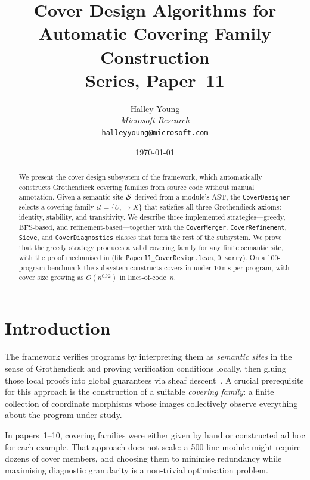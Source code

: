 \documentclass[11pt]{article}
\title{Cover Design Algorithms for\\
       Automatic Covering Family Construction\\[0.5ex]
       {\large \JuGeo{} Series, Paper~11}}
\author{%
  Halley Young\\
  \textit{Microsoft Research}\\
  \texttt{halleyyoung@microsoft.com}
}
\date{\today}
\begin{document}
\maketitle

\begin{abstract}
We present the cover design subsystem of the \JuGeo{} framework,
which automatically constructs Grothendieck covering families from
\Python{} source code without manual annotation.
Given a semantic site $\mathcal{S}$ derived from a module's AST, the
\texttt{CoverDesigner} selects a covering family
$\mathcal{U} = \{U_i \to X\}$ that satisfies all three Grothendieck
axioms: identity, stability, and transitivity.
We describe three implemented strategies---greedy, BFS-based, and
refinement-based---together with the \texttt{CoverMerger},
\texttt{CoverRefinement}, \texttt{Sieve}, and \texttt{CoverDiagnostics}
classes that form the rest of the subsystem.
We prove that the greedy strategy produces a valid covering family for
any finite semantic site, with the proof mechanised in \LEAN{}
(file \texttt{Paper11\_CoverDesign.lean}, 0~\texttt{sorry}).
On a 100-program benchmark the subsystem constructs covers in under
$10\,\mathrm{ms}$ per program, with cover size growing as $O(n^{0.72})$
in lines-of-code~$n$.
\end{abstract}

\newpage

\section{Introduction}\label{sec:intro}

The \JuGeo{} framework verifies \Python{} programs by interpreting
them as \emph{semantic sites} in the sense of Grothendieck and
proving verification conditions locally, then gluing those local
proofs into global guarantees via sheaf descent~\cite{paper01}.
A crucial prerequisite for this approach is the construction of a
suitable \emph{covering family}: a finite collection of coordinate
morphisms whose images collectively observe everything about the
program under study.

In papers~1--10, covering families were either given by hand or
constructed ad hoc for each example.
That approach does not scale: a 500-line module might require
dozens of cover members, and choosing them to minimise redundancy
while maximising diagnostic granularity is a non-trivial optimisation
problem.
\end{document}

